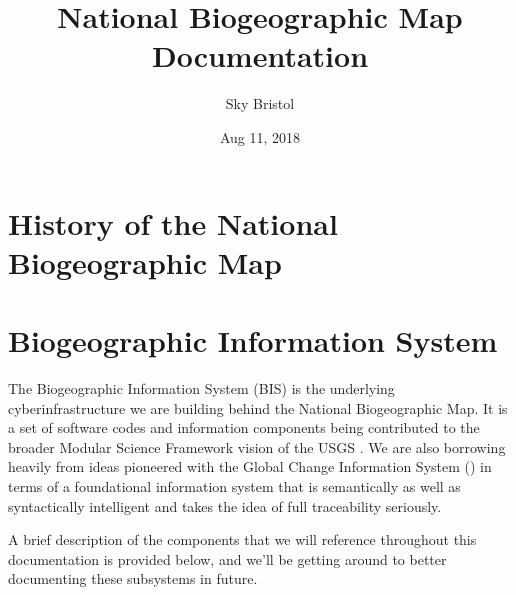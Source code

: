 \documentclass[letterpaper,10pt,english]{sphinxmanual}
\title{National Biogeographic Map Documentation}
\date{Aug 11, 2018}
\author{Sky Bristol}
\begin{document}
\maketitle
\sphinxtableofcontents
{}\label{\detokenize{index::doc}}



\chapter{History of the National Biogeographic Map}
\label{\detokenize{history:usgs-national-biogeographic-map}}\label{\detokenize{history::doc}}\label{\detokenize{history:history-of-the-national-biogeographic-map}}

\chapter{Biogeographic Information System}
\label{\detokenize{bis:bis}}\label{\detokenize{bis::doc}}\label{\detokenize{bis:biogeographic-information-system}}
The Biogeographic Information System (BIS) is the underlying cyberinfrastructure we are building behind the National Biogeographic Map. It is a set of software codes and information components being contributed to the broader Modular Science Framework vision of the USGS \label{\detokenize{bis:id1}}{\hyperref[\detokenize{references:csssciencestrategy}]{\sphinxcrossref{{[}CSSScienceStrategy{]}}}}. We are also borrowing heavily from ideas pioneered with the Global Change Information System () in terms of a foundational information system that is semantically as well as syntactically intelligent and takes the idea of full traceability seriously.

A brief description of the components that we will reference throughout this documentation is provided below, and we’ll be getting around to better documenting these subsystems in future.
\end{document}
